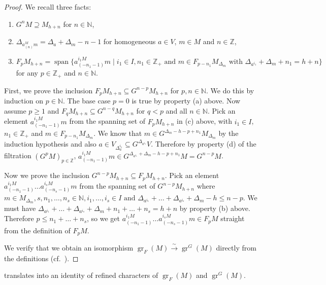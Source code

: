 \documentclass[a4paper, 12pt, reqno]{amsart}
\theoremstyle{remark}
\numberwithin{equation}{subsection}
\DeclareMathOperator{\gr}{gr}
\DeclareMathOperator{\vspan}{span}
\begin{document}
\begin{proof}
  We recall three facts:
  \begin{enumerate}
  \item $G^nM \supseteq M_{h + n}$ for $n \in \mathbb{N}$,
  \item $\Delta_{a^M_{(n)}m} = \Delta_a + \Delta_m - n - 1$ for homogeneous $a \in V$, $m \in M$ and $n \in \mathbb{Z}$,
  \item $F_pM_{h + n} = \vspan\{a^{i_1M}_{(-n_1 - 1)}m \mid i_1 \in I, n_1 \in \mathbb{Z}_+\text{ and }m \in F_{p - n_1}M_{\Delta_m}\text{ with }\Delta_{a^{i_1}} + \Delta_m + n_1 = h + n\}$ for any $p \in \mathbb{Z}_+$ and $n \in \mathbb{N}$.
  \end{enumerate}
  First, we prove the inclusion $F_pM_{h + n} \subseteq G^{n - p}M_{h + n}$ for $p, n \in \mathbb{N}$.
  We do this by induction on $p \in \mathbb{N}$.
  The base case $p = 0$ is true by property (a) above.
  Now assume $p \ge 1$ and $F_qM_{h + n} \subseteq G^{n - q}M_{h + n}$ for $q < p$ and all $n \in \mathbb{N}$.
  Pick an element $a^{i_1M}_{(-n_1 - 1)}m$ from the spanning set of $F_pM_{h + n}$ in (c) above, with $i_1 \in I$, $n_1 \in \mathbb{Z}_+$ and $m \in F_{p - n_1}M_{\Delta_m}$.
  We know that $m \in G^{\Delta_m - h - p + n_1}M_{\Delta_m}$ by the induction hypothesis and also $a \in V_{\Delta_a^{i_1}} \subseteq G^{\Delta_{a^{i_1}}}V$.
  Therefore by property (d) of the filtration $(G^pM)_{p \in \mathbb{Z}}$, $a^{i_1M}_{(-n_1 - 1)}m \in G^{\Delta_{a^{i_1}} + \Delta_m - h - p + n_1}M = G^{n - p}M$.

  Now we prove the inclusion $G^{n - p}M_{h + n} \subseteq F_pM_{h + n}$.
  Pick an element $a^{i_1M}_{(-n_1 - 1)}\dots a^{i_sM}_{(-n_s - 1)}m$ from the spanning set of $G^{n - p}M_{h + n}$ where $m \in M_{\Delta_m}, s, n_1, \dots, n_s\in \mathbb{N}, i_1, \dots, i_s \in I\text{ and }\Delta_{a^{i_1}} + \dots + \Delta_{a^{i_s}} + \Delta_m - h \le n - p$.
  We must have $\Delta_{a^{i_1}} + \dots + \Delta_{a^{i_s}} + \Delta_m + n_1 + \dots + n_s = h + n$ by property (b) above.
  Therefore $p \le n_1 + \dots + n_s$, so we get $a^{i_1M}_{(-n_1 - 1)}\dots a^{i_sM}_{(-n_s - 1)}m \in F_pM$ straight from the definition of $F_pM$.

  We verify that we obtain an isomorphism $\gr_F(M) \xrightarrow{\sim} \gr^G(M)$ directly from the definitions (cf.\ ).
\end{proof}

 translates into an identity of refined characters of $\gr_F(M)$ and $\gr^G(M)$.
\end{document}
